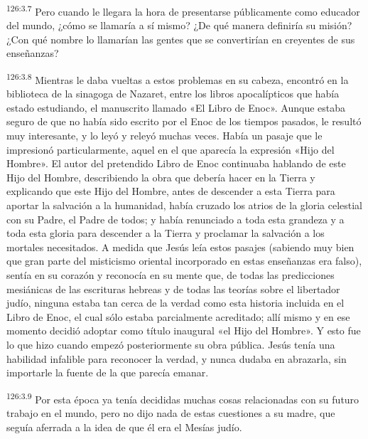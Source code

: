 \par 
\textsuperscript{126:3.7} Pero cuando le llegara la hora de presentarse públicamente como educador del mundo, ¿cómo se llamaría a sí mismo? ¿De qué manera definiría su misión? ¿Con qué nombre lo llamarían las gentes que se convertirían en creyentes de sus enseñanzas?

\par 
\textsuperscript{126:3.8} Mientras le daba vueltas a estos problemas en su cabeza, encontró en la biblioteca de la sinagoga de Nazaret, entre los libros apocalípticos que había estado estudiando, el manuscrito llamado «El Libro de Enoc». Aunque estaba seguro de que no había sido escrito por el Enoc de los tiempos pasados, le resultó muy interesante, y lo leyó y releyó muchas veces. Había un pasaje que le impresionó particularmente, aquel en el que aparecía la expresión «Hijo del Hombre». El autor del pretendido Libro de Enoc continuaba hablando de este Hijo del Hombre, describiendo la obra que debería hacer en la Tierra y explicando que este Hijo del Hombre, antes de descender a esta Tierra para aportar la salvación a la humanidad, había cruzado los atrios de la gloria celestial con su Padre, el Padre de todos; y había renunciado a toda esta grandeza y a toda esta gloria para descender a la Tierra y proclamar la salvación a los mortales necesitados. A medida que Jesús leía estos pasajes (sabiendo muy bien que gran parte del misticismo oriental incorporado en estas enseñanzas era falso), sentía en su corazón y reconocía en su mente que, de todas las predicciones mesiánicas de las escrituras hebreas y de todas las teorías sobre el libertador judío, ninguna estaba tan cerca de la verdad como esta historia incluida en el Libro de Enoc, el cual sólo estaba parcialmente acreditado; allí mismo y en ese momento decidió adoptar como título inaugural «el Hijo del Hombre». Y esto fue lo que hizo cuando empezó posteriormente su obra pública. Jesús tenía una habilidad infalible para reconocer la verdad, y nunca dudaba en abrazarla, sin importarle la fuente de la que parecía emanar.

\par 
\textsuperscript{126:3.9} Por esta época ya tenía decididas muchas cosas relacionadas con su futuro trabajo en el mundo, pero no dijo nada de estas cuestiones a su madre, que seguía aferrada a la idea de que él era el Mesías judío.

